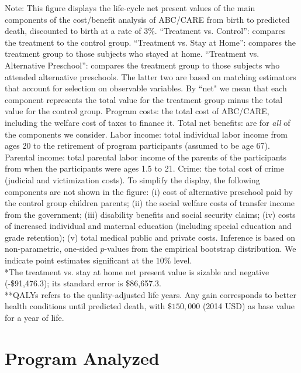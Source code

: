 \documentclass[static]{JJH-Beamer}
\begin{document}
{\flushleft \small Note: This figure displays the life-cycle net present values of the main components of the cost/benefit analysis of ABC/CARE from birth to predicted death, discounted to birth at a rate of 3\%. ``Treatment vs. Control'': compares the treatment to the control group. ``Treatment vs. Stay at Home'': compares the treatment group to those subjects who stayed at home. ``Treatment vs. Alternative Preschool'': compares the treatment group to those subjects who attended alternative preschools. The latter two are based on matching estimators that account for selection on observable variables. By ``net" we mean that each component represents the total value for the treatment group minus the total value for the control group. Program costs: the total cost of ABC/CARE, including the welfare cost of taxes to finance it. Total net benefits: are for \textit{all} of the components we consider. Labor income: total individual labor income from ages 20 to the retirement of program participants (assumed to be age 67). Parental income: total parental labor income of the parents of the participants from when the participants were ages 1.5 to 21. Crime: the total cost of crime (judicial and victimization costs). To simplify the display, the following components are not shown in the figure: (i) cost of alternative preschool paid by the control group children parents; (ii) the social welfare costs of transfer income from the government; (iii) disability benefits and social security claims; (iv) costs of increased individual and maternal education (including special education and grade retention); (v) total medical public and private costs. Inference is based on non-parametric, one-sided $p$-values from the empirical bootstrap distribution. We indicate point estimates significant at the $10\%$ level.\\
*The treatment vs. stay at home net present value is sizable and negative (-\$91,476.3); its standard error is \$86,657.3.\\
**QALYs refers to the quality-adjusted life years. Any gain corresponds to better health conditions until predicted death, with $\$150,000$ (2014 USD) as base value for a year of life.\\}

\clearpage

\section{Program Analyzed} 
\end{document}
